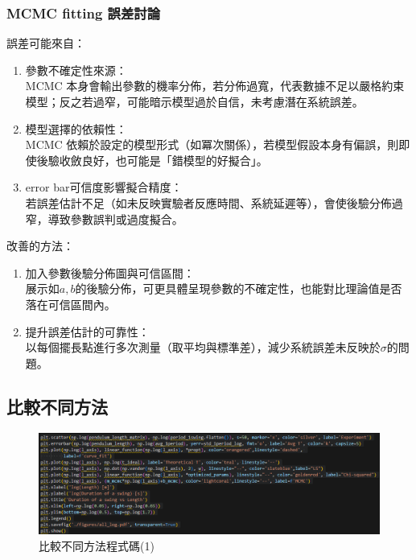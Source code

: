 \documentclass[12pt,a4paper]{article}
\begin{document}
\begin{CJK}{UTF8}{bkai}
\subsubsection{MCMC fitting 誤差討論}
\hfill

\indent 誤差可能來自：
\begin{enumerate}
    \item 參數不確定性來源：\\MCMC 本身會輸出參數的機率分佈，若分佈過寬，代表數據不足以嚴格約束模型；反之若過窄，可能暗示模型過於自信，未考慮潛在系統誤差。
    \item 模型選擇的依賴性：\\MCMC 依賴於設定的模型形式（如冪次關係），若模型假設本身有偏誤，則即使後驗收斂良好，也可能是「錯模型的好擬合」。
    \item error bar可信度影響擬合精度：\\若誤差估計不足（如未反映實驗者反應時間、系統延遲等），會使後驗分佈過窄，導致參數誤判或過度擬合。
\end{enumerate}

\clearpage

\indent 改善的方法：
\begin{enumerate}
    \item 加入參數後驗分佈圖與可信區間：\\展示如$a,b$的後驗分佈，可更具體呈現參數的不確定性，也能對比理論值是否落在可信區間內。
    \item 提升誤差估計的可靠性：\\以每個擺長點進行多次測量（取平均與標準差），減少系統誤差未反映於$\sigma$的問題。
\end{enumerate}



\subsection{比較不同方法}
\hfill

\begin{figure}[h]
    \centering
    \includegraphics[width=1\linewidth]{CAM1.png}
    \caption{比較不同方法\-程式碼(1)}
    \label{fig:CAM1}
\end{figure}


\end{CJK}
\end{document}
